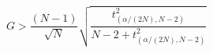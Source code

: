 

\[
G > \frac{(N-1)} {\sqrt{N}} \sqrt{\frac{t^{2}_{(\alpha/(2N),N-2)}} {N-2+t^{2}_{(\alpha/(2N),N-2)}}}
\]


